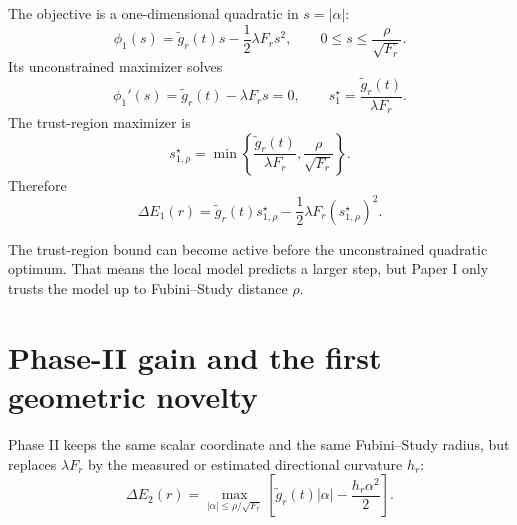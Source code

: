 \documentclass[10pt,twocolumn]{article}
\begin{document}
The objective is a one-dimensional quadratic in \(s=|\alpha|\):
\begin{equation}
\phi_1(s)
=\widetilde g_r(t)s-\frac12\lambda F_r s^2,
\qquad
0\le s\le\frac{\rho}{\sqrt{F_r}}.
\label{eq:phase1_s_model}
\end{equation}
Its unconstrained maximizer solves
\begin{equation}
\phi_1'(s)=\widetilde g_r(t)-\lambda F_r s=0,
\qquad
s_1^\star=\frac{\widetilde g_r(t)}{\lambda F_r}.
\label{eq:phase1_unconstrained}
\end{equation}
The trust-region maximizer is
\begin{equation}
s_{1,\rho}^\star=
\min\left\{
\frac{\widetilde g_r(t)}{\lambda F_r},
\frac{\rho}{\sqrt{F_r}}
\right\}.
\label{eq:phase1_constrained_s}
\end{equation}
Therefore
\begin{equation}
\Delta E_1(r)
=\widetilde g_r(t)s_{1,\rho}^\star
-\frac12\lambda F_r(s_{1,\rho}^\star)^2.
\label{eq:phase1_closed}
\end{equation}

\begin{intuitionbox}
The trust-region bound can become active before the unconstrained quadratic optimum. That means the local model predicts a larger step, but Paper I only trusts the model up to Fubini--Study distance \(\rho\).
\end{intuitionbox}

\section{Phase-II gain and the first geometric novelty}

Phase II keeps the same scalar coordinate and the same Fubini--Study radius, but replaces \(\lambda F_r\) by the measured or estimated directional curvature \(h_r\):
\begin{equation}
\boxed{
\Delta E_2(r)
=
\max_{|\alpha|\le \rho/\sqrt{F_r}}
\left[
\widetilde g_r(t)|\alpha|
-\frac{h_r\alpha^2}{2}
\right].
}
\label{eq:phase2_gain}
\end{equation}
\end{document}

